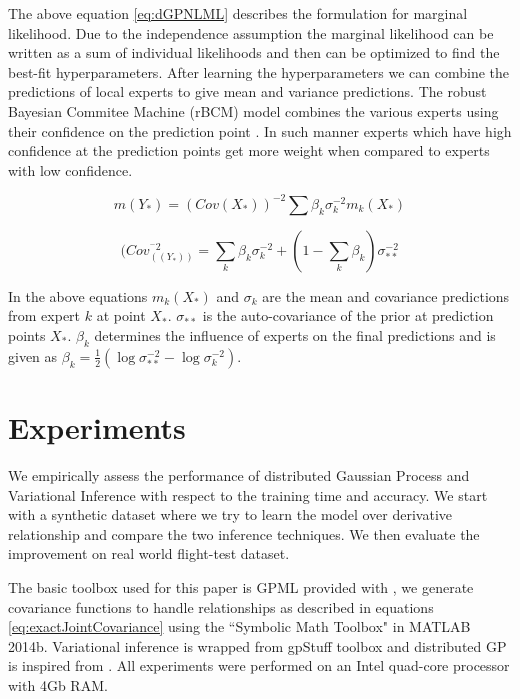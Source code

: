 The above equation \ref{eq:dGPNLML} describes the formulation for marginal likelihood. Due to the independence assumption the marginal likelihood can be written as a sum of individual likelihoods and then can be optimized to find the best-fit hyperparameters. After learning the hyperparameters we can combine the predictions of local experts to give mean and variance predictions. The robust Bayesian Commitee Machine (rBCM) model combines the various experts using their confidence on the prediction point \cite{deisenroth2015distributed}. In such manner experts which have high confidence at the prediction points get more weight when compared to experts with low confidence. 

\begin{equation}\label{eq:meanDGP}
    m(Y_{*}) = (Cov(X_{*}))^{-2}\sum \beta_{k}\sigma_{k}^{-2}m_{k}(X_{*})
\end{equation}

\begin{equation}
    (Cov_((Y_{*}))^{^-2} = \sum_{k} \beta_{k}\sigma_{k}^{-2} + (1- \sum_{k} \beta_{k})\sigma^{-2}_{**}
\end{equation}

In the above equations \(m_{k}(X_{*})\) and \(\sigma_{k}\) are the mean and covariance predictions from expert \(k\) at point \(X_{*}\). \(\sigma_{**}\) is the auto-covariance of the prior at prediction points \(X_{*}\). \(\beta_{k}\) determines the influence of experts on the final predictions \cite{DBLP:journals/corr/CaoF14} and is given as \(\beta_{k} = \frac{1}{2}(\log\sigma_{**}^{-2} - \log\sigma_{k}^{-2})\).  

\section{Experiments}\label{sec:experiments}
\noindent We empirically assess the performance of distributed Gaussian Process and Variational Inference with respect to the training time and accuracy. We start with a synthetic dataset where we try to learn the model over derivative relationship and compare the two inference techniques. We then evaluate the improvement on real world flight-test dataset.

The basic toolbox used for this paper is GPML provided with \cite{Rasmussen2005}, we generate covariance functions to handle relationships as described in equations \ref{eq:exactJointCovariance} using the ``Symbolic Math Toolbox" in MATLAB 2014b. Variational inference is wrapped from gpStuff toolbox \cite{Vanhatalo:2013:GBM:2567709.2502617} and distributed GP is inspired from \cite{deisenroth2015distributed}. All experiments were performed on an Intel quad-core processor with 4Gb RAM.
  
